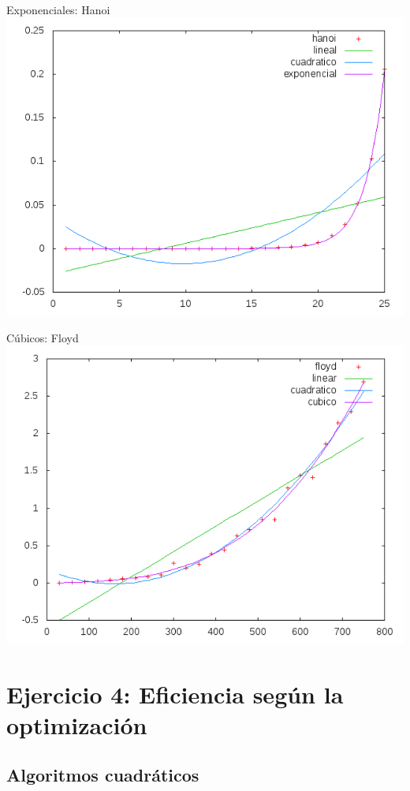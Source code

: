 \documentclass[10pt,compress,usetitleprogressbar,mathserif]{beamer}
\begin{document}
\begin{frame}{Exponenciales: Hanoi}
	\includegraphics[width = \textwidth ]{img/expo_hibrida2.pdf}
\end{frame}

\begin{frame}{Cúbicos: Floyd}
	\includegraphics[width = \textwidth ]{img/floyd_hibrida.pdf}
\end{frame}

\section{Ejercicio 4: \large{Eficiencia según la optimización }}

\subsection{Algoritmos cuadráticos}
\end{document}
